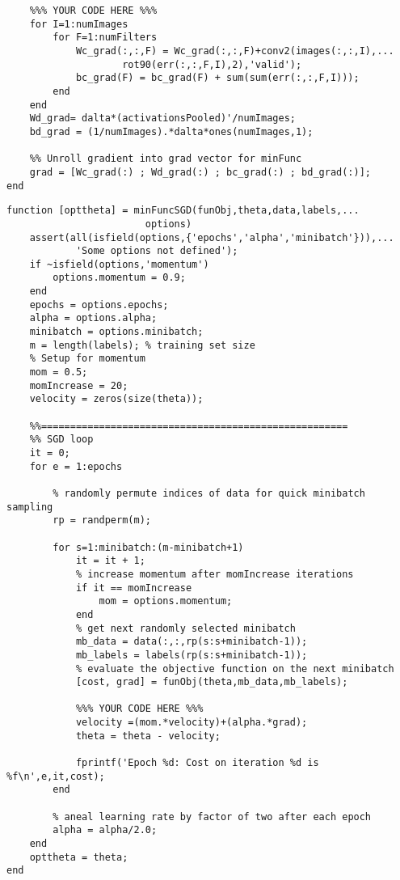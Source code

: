 \documentclass[12pt] {article}
\begin{document}
\begin{lstlisting}
	%%% YOUR CODE HERE %%%
	for I=1:numImages
    	for F=1:numFilters
			Wc_grad(:,:,F) = Wc_grad(:,:,F)+conv2(images(:,:,I),...
            		rot90(err(:,:,F,I),2),'valid');
	        bc_grad(F) = bc_grad(F) + sum(sum(err(:,:,F,I)));
    	end
	end
	Wd_grad= dalta*(activationsPooled)'/numImages;
	bd_grad = (1/numImages).*dalta*ones(numImages,1);

	%% Unroll gradient into grad vector for minFunc
	grad = [Wc_grad(:) ; Wd_grad(:) ; bc_grad(:) ; bd_grad(:)];
end
\end{lstlisting}

\newpage

\begin{lstlisting}
function [opttheta] = minFuncSGD(funObj,theta,data,labels,...
                        options)
	assert(all(isfield(options,{'epochs','alpha','minibatch'})),...
    	    'Some options not defined');
	if ~isfield(options,'momentum')
    	options.momentum = 0.9;
	end
	epochs = options.epochs;
	alpha = options.alpha;
	minibatch = options.minibatch;
	m = length(labels); % training set size
	% Setup for momentum
	mom = 0.5;
	momIncrease = 20;
	velocity = zeros(size(theta));

	%%=====================================================
	%% SGD loop
	it = 0;
	for e = 1:epochs
    
    	% randomly permute indices of data for quick minibatch sampling
	    rp = randperm(m);
    
    	for s=1:minibatch:(m-minibatch+1)
        	it = it + 1;
	        % increase momentum after momIncrease iterations
    	    if it == momIncrease
        	    mom = options.momentum;
	        end
	        % get next randomly selected minibatch
    	    mb_data = data(:,:,rp(s:s+minibatch-1));
        	mb_labels = labels(rp(s:s+minibatch-1));
	        % evaluate the objective function on the next minibatch
    	    [cost, grad] = funObj(theta,mb_data,mb_labels);
        
	        %%% YOUR CODE HERE %%%
    	    velocity =(mom.*velocity)+(alpha.*grad);
        	theta = theta - velocity;
        
	        fprintf('Epoch %d: Cost on iteration %d is %f\n',e,it,cost);
    	end

	    % aneal learning rate by factor of two after each epoch
    	alpha = alpha/2.0;
	end
	opttheta = theta;
end

\end{lstlisting}
\end{document}
